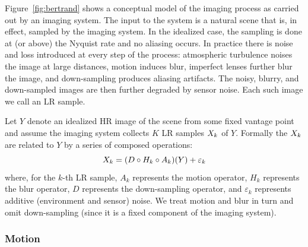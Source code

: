 Figure~\ref{fig:bertrand} shows a conceptual model of the imaging process as carried out by an imaging system.
%
The input to the system is a natural scene that is, in effect, sampled by the imaging system.
%
In the idealized case, the sampling is done at (or above) the Nyquist rate and no aliasing occurs.
%
In practice there is noise and loss introduced at every step of the process: atmospheric turbulence noises the image at large distances, motion induces blur, imperfect lenses further blur the image, and down-sampling produces aliasing artifacts.
%
The noisy, blurry, and down-sampled images are then further degraded by sensor noise.
%
Each such image we call an LR sample.

Let \(Y\) denote an idealized HR image of the scene from some fixed vantage point and assume the imaging system collects \(K\) LR samples \(X_k\) of \(Y\).
%
Formally the \(X_k\) are related to \(Y\) by a series of composed operations:
\begin{equation}
	X_k = (D \circ H_k \circ A_k) (Y) + \varepsilon_k
	\label{eqn:imagingmodel}
\end{equation}
where, for the \(k\)-th LR sample, \(A_k\) represents the motion operator, \(H_k\) represents the blur operator, \(D\) represents the down-sampling operator, and \(\varepsilon_k\) represents additive (environment and sensor) noise. We treat motion and blur in turn and omit down-sampling (since it is a fixed component of the imaging system).

\subsubsection{Motion}


